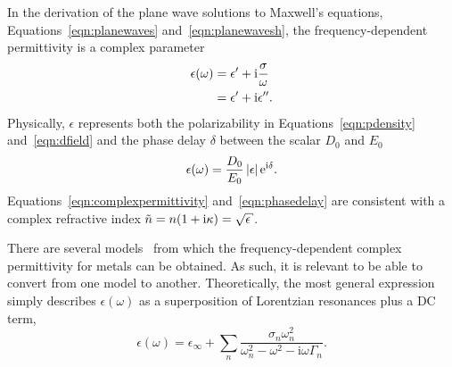In the derivation of the plane wave solutions to Maxwell's equations,
Equations~\ref{eqn:planewaves} and~\ref{eqn:planewavesh}, the
frequency-dependent permittivity is a complex parameter
\begin{align}
  \epsilon(\omega) & = \epsilon^\prime + {\mathrm{i}} \frac{\sigma}{\omega}   \\
                   & = \epsilon^\prime + {\mathrm{i}}\epsilon^{\prime\prime}.
  \label{eqn:complexpermittivity}
\end{align}
Physically, $\epsilon$ represents both the polarizability in
Equations~\ref{eqn:pdensity} and~\ref{eqn:dfield} and the phase delay
$\delta$ between the scalar $D_0$ and
$E_0$
\begin{equation}
  \epsilon(\omega) = \frac{D_0}{E_0} \,|\epsilon| \,{\mathrm{e}}^{{\mathrm{i}} \delta}.
  \label{eqn:phasedelay}
\end{equation}
Equations~\ref{eqn:complexpermittivity} and~\ref{eqn:phasedelay} are
consistent with a complex refractive index $\tilde{n} = n(1+\mi \kappa) =
  \sqrt{\epsilon}$.

There are several models~\cite{rakic1998optical} from which
the frequency-dependent complex permittivity for metals can be obtained.
As such, it is relevant to be able to convert from one model to another.
Theoretically, the most general expression simply describes
$\epsilon(\omega)$ as a superposition of Lorentzian resonances plus a DC
term,
\begin{equation}
  \epsilon(\omega)= \epsilon_\infty+\sum_n \frac{\sigma_n \omega_n^2} {\omega_n^2-\omega^2-{\mathrm{i}}\omega\Gamma_n}.
  \label{eqn:meepdispersion}
\end{equation}

